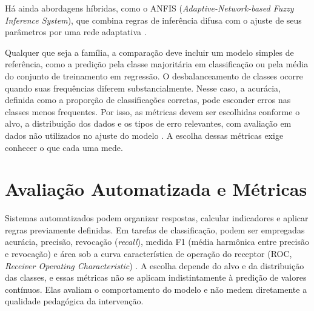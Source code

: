 Há ainda abordagens híbridas, como o ANFIS (\textit{Adaptive-Network-based Fuzzy Inference System}), que combina regras de inferência difusa com o ajuste de seus parâmetros por uma rede adaptativa \cite{Jang1993}.

Qualquer que seja a família, a comparação deve incluir um modelo simples de referência, como a predição pela classe majoritária em classificação ou pela média do conjunto de treinamento em regressão. O desbalanceamento de classes ocorre quando suas frequências diferem substancialmente. Nesse caso, a acurácia, definida como a proporção de classificações corretas, pode esconder erros nas classes menos frequentes. Por isso, as métricas devem ser escolhidas conforme o alvo, a distribuição dos dados e os tipos de erro relevantes, com avaliação em dados não utilizados no ajuste do modelo \cite{James2021}. A escolha dessas métricas exige conhecer o que cada uma mede.

\section{Avaliação Automatizada e Métricas}
\label{sec:fund-metricas}

Sistemas automatizados podem organizar respostas, calcular indicadores e aplicar regras previamente definidas. Em tarefas de classificação, podem ser empregadas acurácia, precisão, revocação (\textit{recall}), medida F1 (média harmônica entre precisão e revocação) e área sob a curva característica de operação do receptor (ROC, \textit{Receiver Operating Characteristic}) \cite{Romero2020}. A escolha depende do alvo e da distribuição das classes, e essas métricas não se aplicam indistintamente à predição de valores contínuos. Elas avaliam o comportamento do modelo e não medem diretamente a qualidade pedagógica da intervenção.

